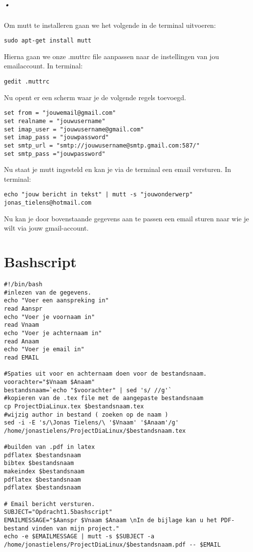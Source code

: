 \documentclass[A4Paper,11pt]{report}
\begin{document}
\paragraph{•}
Om mutt te installeren gaan we het volgende in de terminal uitvoeren:
\begin{lstlisting}
sudo apt-get install mutt
\end{lstlisting}
Hierna gaan we onze .muttrc file aanpassen naar de instellingen van jou emailaccount.
In terminal:
\begin{lstlisting}
gedit .muttrc
\end{lstlisting}
Nu opent er een scherm waar je de volgende regels toevoegd.
\begin{lstlisting}
set from = "jouwemail@gmail.com"
set realname = "jouwusername"
set imap_user = "jouwusername@gmail.com"
set imap_pass = "jouwpassword"
set smtp_url = "smtp://jouwusername@smtp.gmail.com:587/"
set smtp_pass ="jouwpassword"
\end{lstlisting}
Nu staat je mutt ingesteld en kan je via de terminal een email versturen.
In terminal:
\begin{lstlisting}
echo "jouw bericht in tekst" | mutt -s "jouwonderwerp" jonas_tielens@hotmail.com
\end{lstlisting}
Nu kan je door bovenstaande gegevens aan te passen een email sturen naar wie je wilt via jouw gmail-account.
\newpage
\renewcommand{\appendixname}{Bijlage}
\chapter{Bashscript}
\begin{lstlisting}
#!/bin/bash
#inlezen van de gegevens.
echo "Voer een aanspreking in"
read Aanspr
echo "Voer je voornaam in"
read Vnaam
echo "Voer je achternaam in"
read Anaam
echo "Voer je email in"
read EMAIL

#Spaties uit voor en achternaam doen voor de bestandsnaam.
voorachter="$Vnaam $Anaam"
bestandsnaam=`echo "$voorachter" | sed 's/ //g'`
#kopieren van de .tex file met de aangepaste bestandsnaam
cp ProjectDiaLinux.tex $bestandsnaam.tex
#wijzig author in bestand ( zoeken op de naam )
sed -i -E 's/\Jonas Tielens/\ '$Vnaam' '$Anaam'/g' /home/jonastielens/ProjectDiaLinux/$bestandsnaam.tex

#builden van .pdf in latex
pdflatex $bestandsnaam
bibtex $bestandsnaam
makeindex $bestandsnaam
pdflatex $bestandsnaam
pdflatex $bestandsnaam

# Email bericht versturen.
SUBJECT="Opdracht1.5bashscript"
EMAILMESSAGE="$Aanspr $Vnaam $Anaam \nIn de bijlage kan u het PDF-bestand vinden van mijn project."
echo -e $EMAILMESSAGE | mutt -s $SUBJECT -a /home/jonastielens/ProjectDiaLinux/$bestandsnaam.pdf -- $EMAIL 
\end{lstlisting}
\newpage
\listoffigures
\listoftables
\printindex
 

\nocite{SiteGit,SiteMutt,SiteMutt2,SiteGit,SiteVoorNadelen,SiteVergelijking,SiteWat,SiteInstall}
\end{document}
